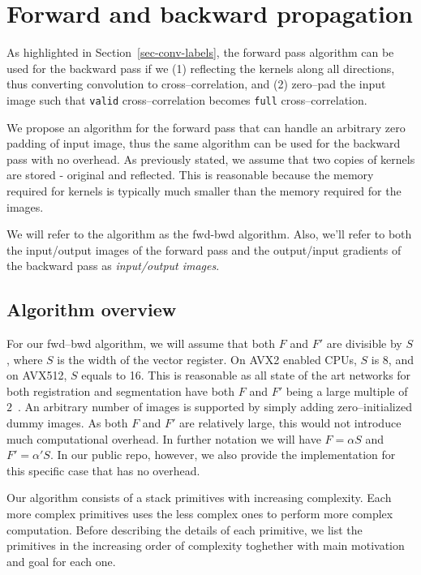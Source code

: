 \section{Forward and backward propagation}

  As highlighted in Section~\ref{sec-conv-labels}, the forward pass
  algorithm can be used for the backward pass if we (1) reflecting the
  kernels along all directions, thus converting convolution to
  cross--correlation, and (2) zero--pad the input image such that
  \texttt{valid} cross--correlation becomes \texttt{full}
  cross--correlation.

  We propose an algorithm for the forward pass that can handle an
  arbitrary zero padding of input image, thus the same algorithm can
  be used for the backward pass with no overhead.  As previously
  stated, we assume that two copies of kernels are stored - original
  and reflected.  This is reasonable because the memory required for
  kernels is typically much smaller than the memory required for the
  images.

  We will refer to the algorithm as the fwd-bwd algorithm.  Also,
  we'll refer to both the input/output images of the forward pass and
  the output/input gradients of the backward pass as
  \emph{input/output images}.

  \subsection{Algorithm overview}

  For our fwd--bwd algorithm, we will assume that both $F$ and $F'$
  are divisible by $S$, where $S$ is the width of the vector register.
  On AVX2 enabled CPUs, $S$ is 8, and on AVX512, $S$ equals to 16.
  This is reasonable as all state of the art networks for both
  registration and segmentation have both $F$ and $F'$ being a large
  multiple of $2$~\cite{krizhevsky2012imagenet, ronneberger2015u,
    simonyan2014very, sermanet2013overfeat, long2015fully,
    tran2015learning, ji20133d, maturana_iros_2015,
    maturana_icra_2014}.  An arbitrary number of images is supported
  by simply adding zero--initialized dummy images.  As both $F$ and
  $F'$ are relatively large, this would not introduce much
  computational overhead.  In further notation we will have $F =
  \alpha S$ and $F' = \alpha' S$.  In our public repo, however, we
  also provide the implementation for this specific case that has no
  overhead.

  Our algorithm consists of a stack primitives with increasing
  complexity.  Each more complex primitives uses the less complex ones
  to perform more complex computation.  Before describing the details
  of each primitive, we list the primitives in the increasing order of
  complexity toghether with main motivation and goal for each one.

